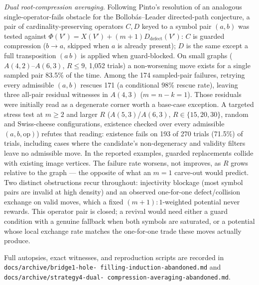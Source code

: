 \emph{Dual root-compression averaging.}
Following Pinto's resolution of an analogous single-operator-fails
obstacle for the Bollob\'as--Leader directed-path conjecture, a pair of
cardinality-preserving operators $C,D$ keyed to a symbol pair $(a,b)$
was tested against $\Phi(V')=X(V')+(m+1)D_{\mathrm{defect}}(V')$: $C$
is guarded compression ($b\to a$, skipped when $a$ is already present);
$D$ is the same except a full transposition $(a\,b)$ is applied when
guard-blocked.  On small graphs ($A(4,2)$--$A(6,3)$, $R\le9$, 1,052
trials) a non-worsening move exists for a single sampled pair 83.5\% of
the time.  Among the 174 sampled-pair failures, retrying every admissible
$(a,b)$ rescues 171 (a conditional 98\% rescue rate), leaving three
all-pair residual witnesses in $A(4,3)$ ($m=n-k=1$).  Those residuals
were initially read as a degenerate corner worth a base-case exception. A targeted stress test
at $m\ge2$ and larger $R$ ($A(5,3)$/$A(6,3)$, $R\in\{15,20,30\}$,
random and Swiss-cheese configurations, existence checked over every
admissible $(a,b,\mathrm{op})$) refutes that reading: existence fails on
193 of 270 trials (71.5\%)
of trials, including cases where the candidate's non-degeneracy and
validity filters leave no admissible move. In the reported examples,
guarded replacements collide with existing image vertices. The failure rate
worsens, not improves, as $R$
grows relative to the graph --- the opposite of what an $m=1$ carve-out
would predict.  Two distinct obstructions recur throughout: injectivity
blockage (most symbol pairs are invalid at high density) and an observed
one-for-one defect/collision exchange on valid moves, which a fixed
$(m+1){:}1$-weighted potential never rewards.  This operator pair is
closed; a revival would need either a guard condition with a genuine
fallback when both symbols are saturated, or a potential whose local
exchange rate matches the one-for-one trade these moves actually
produce.

Full autopsies, exact witnesses, and reproduction scripts are recorded
in \texttt{docs/archive/bridge1-\allowbreak hole-\allowbreak
filling-\allowbreak induction-\allowbreak abandoned.md} and
\texttt{docs/archive/strategy4-\allowbreak dual-\allowbreak
compression-\allowbreak averaging-\allowbreak abandoned.md}.

